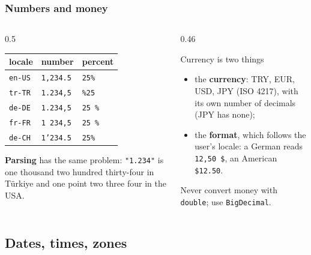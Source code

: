 \documentclass[aspectratio=169,10pt,compress]{beamer}
\begin{document}
\begin{frame}[t,fragile] \frametitle{Numbers and money}
  \begin{columns}[T]
    \begin{column}{0.5\textwidth}
      \begin{center}\small
      \begin{tabular}{lll}
        \toprule
        \textbf{locale} & \textbf{number} & \textbf{percent} \\
        \midrule
        \texttt{en-US} & \texttt{1,234.5}  & \texttt{25\%} \\
        \texttt{tr-TR} & \texttt{1.234,5}  & \texttt{\%25} \\
        \texttt{de-DE} & \texttt{1.234,5}  & \texttt{25 \%} \\
        \texttt{fr-FR} & \texttt{1\,234,5} & \texttt{25 \%} \\
        \texttt{de-CH} & \texttt{1'234.5}  & \texttt{25\%} \\
        \bottomrule
      \end{tabular}
      \end{center}
      \small \textbf{Parsing} has the same problem: \texttt{"1.234"} is one thousand two hundred thirty-four in
      Türkiye and one point two three four in the USA.
    \end{column}
    \begin{column}{0.46\textwidth}
      \begin{block}{Currency is two things}
        \small
        \begin{itemize}
          \item the \textbf{currency}: TRY, EUR, USD, JPY (ISO 4217), with its own number of decimals
            (JPY has none);
          \item the \textbf{format}, which follows the user's locale: a German reads
            \texttt{12,50 \$}, an American \texttt{\$12.50}.
        \end{itemize}
        Never convert money with \texttt{double}; use \texttt{BigDecimal}.
      \end{block}
    \end{column}
  \end{columns}
\end{frame}

\subsection[Time]{Dates, times, zones}
\end{document}
